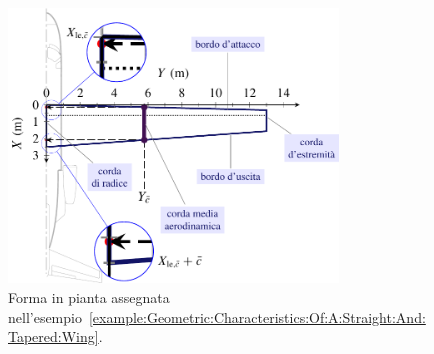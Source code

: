 \documentclass[[12pt,twoside]{book}
\begin{document}
%
\begin{figure}[t]%
    \includegraphics[width=0.78\textwidth]{Chapter_2/geometric_characteristics_of_a_straight_and_tapered_wing/wing_planform_basic_0A_drawing.pdf}%
  \caption{
           Forma in pianta assegnata nell'esempio~\ref{example:Geometric:Characteristics:Of:A:Straight:And:Tapered:Wing}.}
  \label{fig:Wing:Planform:Basic:Drawing:AB}%
\end{figure}%
%

%
\end{document}
